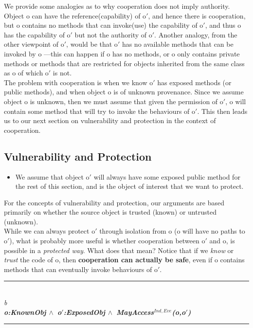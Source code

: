 \documentclass[a4paper,11pt,twoside]{article}
\makeatletter
\newenvironment{logic}
{\begin{minipage}[c]{\linewidth}  \sffamily \mdseries \begin{tabbing}}
{\end{tabbing}\end{minipage}\vspace{0.3em}}
\newcommand{\loand}{$\land$}
\newcommand{\hr}{\rule{\linewidth}{0.4pt}}
\DeclareRobustCommand{\emp}{%
  \@nomath\em \if b\expandafter\@car\f@series\@nil
  \normalfont \else \sffamily \bfseries \fi}
\makeatother
\begin{document}
We provide some analogies as to why cooperation does not imply authority. Object o can have the reference(capability) of o$'$, and hence there is cooperation, but o contains no methods that can invoke(use) the capability of o$'$, and thus o has the capability of o$'$ but not the authority of o$'$. Another analogy, from the other viewpoint of o$'$, would be that o$'$ has no available methods that can be invoked by o ---this can happen if o has no methods, or o only contains private methods or methods that are restricted for objects inherited from the same class as o of which o$'$ is not.\\

The problem with cooperation is when we know o$'$ has exposed methods (or public methods), and when object o is of unknown provenance. Since we assume object o is unknown, then we must assume that given the permission of o$'$, o will contain some method that will try to invoke the behaviours of o$'$. This then leads us to our next section on vulnerability and protection in the context of cooperation.

\subsection{Vulnerability and Protection}\label{sec:vulnerability and protection}
\begin{itemize}\item We assume that object o$'$ will always have some exposed public method for the rest of this section, and is the object of interest that we want to protect.\end{itemize}
For the concepts of vulnerability and protection, our arguments are based primarily on whether the source object is trusted (known) or untrusted (unknown).\\

While we can always protect o$'$ through isolation from o (o will have no paths to o$'$), what is probably more useful is whether cooperation between o$'$ and o, is possible in a \textit{protected way}. What does that mean? Notice that if we \textit{know} or \textit{trust} the code of o, then \textbf{cooperation can actually be safe}, even if o contains methods that can eventually invoke behaviours of o$'$.\\

\begin{logic}
\hr\\
\emp{Lemma---[Known-Safe cooperation]}\\
o:KnownObj \loand\ o$'$:ExposedObj \loand\ MayAccess$^{Ind,Eve}$(o,o$'$)\\
\hr
\end{logic}
\end{document}
